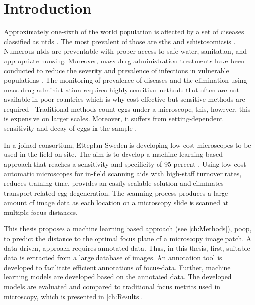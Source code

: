 \chapter{Introduction}
\label{ch:Introduction}

Approximately one-sixth of the world population is affected by a set of diseases classified as \acfp{ntd} \cite{feasey2010neglected}. The most prevalent of those are \acfp{sth} and schistosomiasis \cite{barenbold2017estimating}. Numerous \acp{ntd} are preventable with proper access to safe water, sanitation, and appropriate housing. Moreover, mass drug administration treatments have been conducted to reduce the severity and prevalence of infections in vulnerable populations \cite{jourdan2018soiltransmitted}. The monitoring of prevalence of diseases and the elimination using mass drug administration requires highly sensitive methods that often are not available in poor countries which is why cost-effective but sensitive methods are required \cite{mbongngwese2020diagnostic}.
Traditional methods count eggs under a microscope, this, however, this is expensive on larger scales. Moreover, it suffers from setting-dependent sensitivity and decay of eggs in the sample \cite{barenbold2017estimating}. 

In a joined consortium, Etteplan Sweden \cite{etteplanoyjengineering} is developing low-cost microscopes to be used in the field on site. The aim is to develop a machine learning based approach that reaches a sensitivity and specificity of 95 percent 
\cite{etteplan2021fighting}. Using low-cost automatic microscopes for in-field scanning aids with high-staff turnover rates, reduces training time, provides an easily scalable solution and eliminates transport related egg degeneration.
The scanning process produces a large amount of image data as each location on a microscopy slide is scanned at multiple focus distances.

This thesis proposes a machine learning based approach (see \autoref{ch:Methods}), \ac{poop}, to predict the distance to the optimal focus plane of a microscopy image patch. A data driven, approach requires annotated data. Thus, in this thesis, first, suitable data is extracted from a large database of images. An annotation tool is developed to facilitate efficient annotations of focus-data. Further, machine learning models are developed based on the annotated data. The developed models are evaluated and compared to traditional focus metrics used in microscopy, which is presented in \autoref{ch:Results}.

